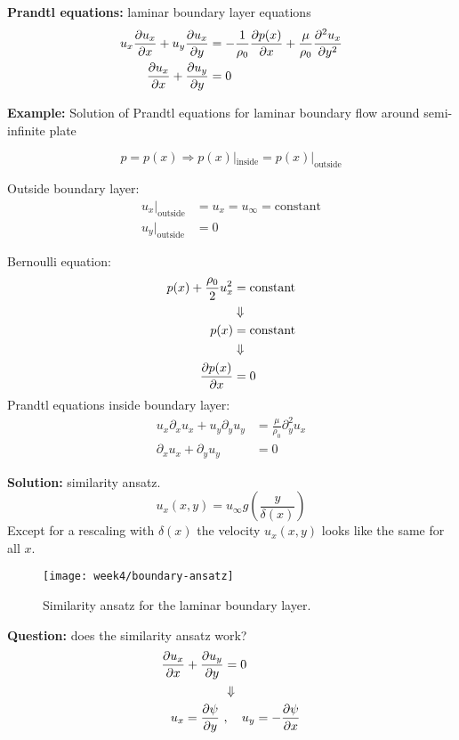 \begin{framed}
\textbf{Prandtl equations:} laminar boundary layer equations
\begin{align}
u_x\frac{\partial u_x}{\partial x}+u_y\frac{\partial u_x}{\partial y} &= -\frac{1}{\rho_0}\frac{\partial p(x)}{\partial x}+\frac{\mu}{\rho_0}\frac{\partial^2 u_x}{\partial y^2} \\
\frac{\partial u_x}{\partial x}+\frac{\partial u_y}{\partial y}&=0
\end{align}
\end{framed}

\textbf{Example:} Solution of Prandtl equations for laminar boundary flow around semi-infinite plate

\begin{equation}
p=p(x) \Rightarrow p(x)|_\mathrm{inside} = p(x)|_\mathrm{outside}
\end{equation}

Outside boundary layer:
\begin{align}
u_x|_\mathrm{outside} &= u_x = u_\infty = \mathrm{constant} \\
u_y|_\mathrm{outside} &= 0
\end{align}

Bernoulli equation:
\begin{align}
p(x) + \frac{\rho_0}{2}u_x^2 &= \mathrm{constant}\\
&\Downarrow\notag\\
p(x) &= \mathrm{constant} \\
&\Downarrow\notag\\
\frac{\partial p(x)}{\partial x} &= 0
\end{align}
Prandtl equations inside boundary layer:
\begin{align}
u_x\partial_xu_x+u_y\partial_yu_y &= \frac{\mu}{\rho_0}\partial_y^2u_x\\
\partial_xu_x+\partial_yu_y &= 0
\end{align}

\textbf{Solution:} similarity ansatz.
\begin{equation}
u_x(x,y) = u_\infty g\left(\frac{y}{\delta(x)}\right)
\end{equation}
Except for a rescaling with $\delta(x)$ the velocity $u_x(x,y)$ looks like the same for all $x$.
\begin{figure}[ht]
    \centering
    \texttt{[image: week4/boundary-ansatz]}\\
    \caption{Similarity ansatz for the laminar boundary layer.}
    \label{fig:boundary-ansatz}
\end{figure}


\textbf{Question:} does the similarity ansatz work?
\begin{align}
\frac{\partial u_x}{\partial x}+\frac{\partial u_y}{\partial y} &= 0 \\
&\Downarrow\notag\\
u_x = \frac{\partial \psi}{\partial y} \ &, \quad u_y = -\frac{\partial \psi}{\partial x}
\end{align}

